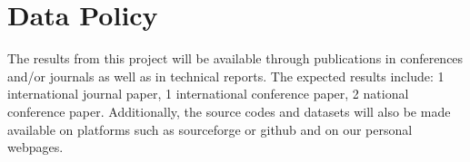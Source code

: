 \section{Data Policy}
\label{sec:data-policy}



The results from this project will be available through publications in conferences and/or journals as well as in technical reports. The expected results include: 1 international journal paper, 1 international conference paper, 2 national conference paper.
Additionally, the source codes and datasets will also be made available on platforms such as sourceforge or github and on our personal webpages. 